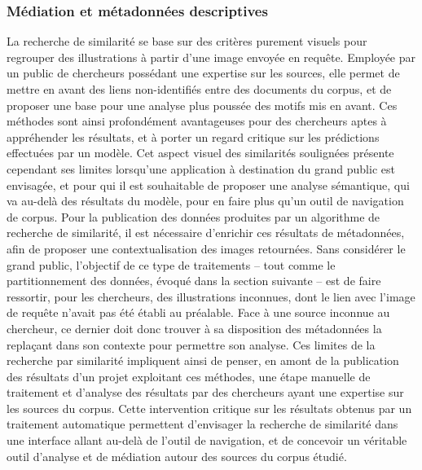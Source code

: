     \subsubsection{Médiation et métadonnées descriptives}
    La recherche de similarité se base sur des critères purement visuels pour regrouper des illustrations à partir d'une image envoyée en requête. Employée par un public de chercheurs possédant une expertise sur les sources, elle permet de mettre en avant des liens non-identifiés entre des documents du corpus, et de proposer une base pour une analyse plus poussée des motifs mis en avant. Ces méthodes sont ainsi profondément avantageuses pour des chercheurs aptes à appréhender les résultats, et à porter un regard critique sur les prédictions effectuées par un modèle. Cet aspect visuel des similarités soulignées présente cependant ses limites lorsqu'une application à destination du grand public est envisagée, et pour qui il est souhaitable de proposer une analyse sémantique, qui va au-delà des résultats du modèle, pour en faire plus qu'un outil de navigation de corpus. Pour la publication des données produites par un algorithme de recherche de similarité, il est nécessaire d'enrichir ces résultats de métadonnées, afin de proposer une contextualisation des images retournées. Sans considérer le grand public, l'objectif de ce type de traitements -- tout comme le partitionnement des données, évoqué dans la section suivante -- est de faire ressortir, pour les chercheurs, des illustrations inconnues, dont le lien avec l'image de requête n'avait pas été établi au préalable. Face à une source inconnue au chercheur, ce dernier doit donc trouver à sa disposition des métadonnées la replaçant dans son contexte pour permettre son analyse. Ces limites de la recherche par similarité impliquent ainsi de penser, en amont de la publication des résultats d'un projet exploitant ces méthodes, une étape manuelle de traitement et d'analyse des résultats par des chercheurs ayant une expertise sur les sources du corpus. Cette intervention critique sur les résultats obtenus par un traitement automatique permettent d'envisager la recherche de similarité dans une interface allant au-delà de l'outil de navigation, et de concevoir un véritable outil d'analyse et de médiation autour des sources du corpus étudié.


